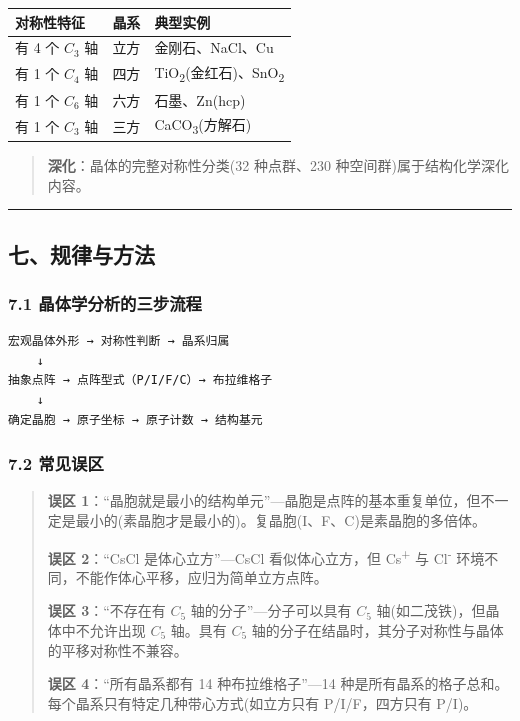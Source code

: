 {\def\LTcaptype{none} %
\begin{longtable}[]{@{}lcl@{}}
\toprule\noalign{}
对称性特征 & 晶系 & 典型实例 \\
\midrule\noalign{}
\endhead
\bottomrule\noalign{}
\endlastfoot
有 4 个 \(C_3\) 轴 & 立方 & 金刚石、NaCl、Cu \\
有 1 个 \(C_4\) 轴 & 四方 & TiO\textsubscript{2}(金红石)、SnO\textsubscript{2} \\
有 1 个 \(C_6\) 轴 & 六方 & 石墨、Zn(hcp) \\
有 1 个 \(C_3\) 轴 & 三方 & CaCO\textsubscript{3}(方解石) \\
\end{longtable}
}

\begin{quote}
\textbf{深化}：晶体的完整对称性分类(32 种点群、230 种空间群)属于结构化学深化内容。
\end{quote}

\begin{center}\rule{0.5\linewidth}{0.5pt}\end{center}

\subsection{七、规律与方法}\label{ux4e03ux89c4ux5f8bux4e0eux65b9ux6cd5}

\subsubsection{7.1 晶体学分析的三步流程}\label{ux6676ux4f53ux5b66ux5206ux6790ux7684ux4e09ux6b65ux6d41ux7a0b}

\begin{verbatim}
宏观晶体外形 → 对称性判断 → 晶系归属
    ↓
抽象点阵 → 点阵型式（P/I/F/C）→ 布拉维格子
    ↓
确定晶胞 → 原子坐标 → 原子计数 → 结构基元
\end{verbatim}

\subsubsection{7.2 常见误区}\label{ux5e38ux89c1ux8befux533a}

\begin{quote}
\textbf{误区 1}：``晶胞就是最小的结构单元''---晶胞是点阵的基本重复单位，但不一定是最小的(素晶胞才是最小的)。复晶胞(I、F、C)是素晶胞的多倍体。

\textbf{误区 2}：``CsCl 是体心立方''---CsCl 看似体心立方，但 Cs\textsuperscript{+} 与 Cl\textsuperscript{-} 环境不同，不能作体心平移，应归为简单立方点阵。

\textbf{误区 3}：``不存在有 \(C_5\) 轴的分子''---分子可以具有 \(C_5\) 轴(如二茂铁)，但晶体中不允许出现 \(C_5\) 轴。具有 \(C_5\) 轴的分子在结晶时，其分子对称性与晶体的平移对称性不兼容。

\textbf{误区 4}：``所有晶系都有 14 种布拉维格子''---14 种是所有晶系的格子总和。每个晶系只有特定几种带心方式(如立方只有 P/I/F，四方只有 P/I)。
\end{quote}

